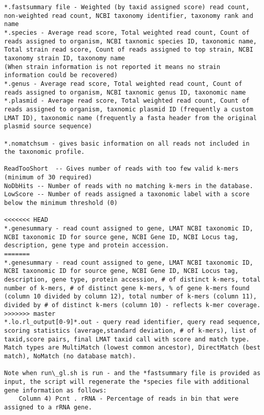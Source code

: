 \documentclass[11pt]{article}
\begin{document}
\begin{verbatim}
*.fastsummary file - Weighted (by taxid assigned score) read count, non-weighted read count, NCBI taxonomy identifier, taxonomy rank and name
*.species - Average read score, Total weighted read count, Count of reads assigned to organism, NCBI taxnomic species ID, taxonomic name, Total strain read score, Count of reads assigned to top strain, NCBI taxonomy strain ID, taxonomy name
(When strain information is not reported it means no strain information could be recovered)
*.genus - Average read score, Total weighted read count, Count of reads assigned to organism, NCBI taxnomic genus ID, taxonomic name
*.plasmid - Average read score, Total weighted read count, Count of reads assigned to organism, taxnomic plasmid ID (frequently a custom LMAT ID), taxonomic name (frequently a fasta header from the original plasmid source sequence)

*.nomatchsum - gives basic information on all reads not included in the taxonomic profile.

ReadTooShort  -- Gives number of reads with too few valid k-mers (minimum of 30 required)
NoDbHits -- Number of reads with no matching k-mers in the database.
LowScore -- Number of reads assigned a taxonomic label with a score below the minimum threshold (0)

<<<<<<< HEAD
*.genesummary - read count assigned to gene, LMAT NCBI taxonomic ID, NCBI taxonomic ID for source gene, NCBI Gene ID, NCBI Locus tag, description, gene type and protein accession.
=======
*.genesummary - read count assigned to gene, LMAT NCBI taxonomic ID, NCBI taxonomic ID for source gene, NCBI Gene ID, NCBI Locus tag, description, gene type, protein accession, # of distinct k-mers, total number of k-mers, # of distinct gene k-mers, % of gene k-mers found (column 10 divided by column 12), total number of k-mers (column 11), divided by # of distinct k-mers (column 10) - reflects k-mer coverage.
>>>>>>> master
*.lo.rl_output[0-9]*.out - query read identifier, query read sequence, scoring statistics (average,standard deviation, # of k-mers), list of taxid,score pairs, final LMAT taxid call with score and match type. Match types are MultiMatch (lowest common ancestor), DirectMatch (best match), NoMatch (no database match).

Note when run\_gl.sh is run - and the *fastsummary file is provided as input, the script will regenerate the *species file with additional gene information as follows:
    Column 4) Pcnt . rRNA - Percentage of reads in bin that were assigned to a rRNA gene.


\end{verbatim}
\end{document}
